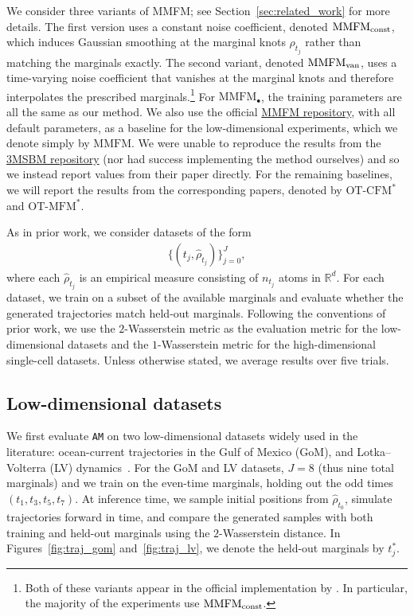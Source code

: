 \documentclass[12pt]{article}
\theoremstyle{plain}
\theoremstyle{plain}
\theoremstyle{remark}
\newcommand{\R}{\mathbb{R}}
\newcommand{\1}{\bm{1}}
\theoremstyle{plain}
\theoremstyle{definition}
\theoremstyle{remark}
\begin{document}
We consider three variants of MMFM; see Section~\ref{sec:related_work} for more details. The first version uses a constant noise coefficient, denoted $\text{MMFM}_{\rm const}$, which induces Gaussian smoothing at the marginal knots $\rho_{t_j}$ rather than matching the marginals exactly.
The second variant, denoted $\text{MMFM}_{\rm van}$, uses a time-varying noise coefficient that vanishes at the marginal knots and therefore interpolates the prescribed marginals.\footnote{Both of these variants appear in the official implementation by \cite{rohbeck2025modeling}. In particular, the majority of the experiments use $\text{MMFM}_{\rm const}$.} For $\text{MMFM}_{\bullet}$, the training parameters are all the same as our method. We also use the official \href{https://github.com/Genentech/MMFM}{MMFM repository}, with all default parameters, as a baseline for the low-dimensional experiments, which we denote simply by $\text{MMFM}$\@. We were {unable to reproduce the results} from the \href{https://github.com/panostheo98/3MSBM}{3MSBM repository} (nor had success implementing the method ourselves) and so we instead report values from their paper directly. For the remaining baselines, we will report the results from the corresponding papers, denoted by $\text{OT-CFM}^*$ and $\text{OT-MFM}^*$.

As in prior work, we consider datasets of the form
\begin{align*}
    \{(t_j,\widehat\rho_{t_j})\}_{j=0}^J,
\end{align*}
where each $\widehat\rho_{t_j}$ is an empirical measure consisting of $n_{t_j}$ atoms in $\R^d$. For each dataset, we train on a subset of the available marginals and evaluate whether the generated trajectories match held-out marginals. Following the conventions of prior work, we use the $2$-Wasserstein metric as the evaluation metric for the low-dimensional datasets and the $1$-Wasserstein metric for the high-dimensional single-cell datasets. Unless otherwise stated, we average results over five trials.

\subsection{Low-dimensional datasets}
We first evaluate \texttt{AM} on two low-dimensional datasets widely used in the literature: ocean-current trajectories in the Gulf of Mexico (GoM), and Lotka--Volterra (LV) dynamics~\citep{shen2024multi}. For the GoM and LV datasets, $J=8$ (thus nine total marginals) and we train on the even-time marginals, holding out the odd times $(t_1,t_3,t_5,t_7)$.
At inference time, we sample initial positions from $\widehat\rho_{t_0}$, simulate trajectories forward in time, and compare the generated samples with both training and held-out marginals using the $2$-Wasserstein distance. In Figures~\ref{fig:traj_gom} and~\ref{fig:traj_lv}, we denote the held-out marginals by $t_j^*$.
\end{document}
